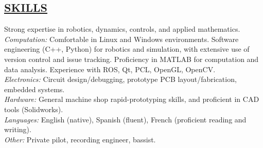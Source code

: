 \documentclass[line,margin]{res}
\newcommand{\CVOnly}[1]{}
\newcommand{\CVOnly}[1]{#1}
\begin{document}
\begin{resume}
\section{\underline{SKILLS}}
\vspace{1.0pc}Strong expertise in robotics, dynamics, controls, and applied mathematics.
\\[0.25pc] {\sl Computation: }
Comfortable in Linux and Windows environments.
Software engineering (C++, Python) for robotics and simulation, with extensive use of version control and issue tracking. 
Proficiency in MATLAB for computation and data analysis.
Experience with ROS, Qt, PCL, OpenGL, OpenCV. 
\\[0.25pc]{\sl Electronics: } Circuit design/debugging, prototype PCB layout/fabrication, embedded systems.  
\\[0.25pc]{\sl Hardware: } General machine shop rapid-prototyping skills, and proficient in CAD tools (Solidworks). 
\\[0.25pc]{\sl Languages: } English (native), Spanish (fluent), French (proficient reading and writing). 
\\[0.25 		pc]{\sl Other: } Private pilot, recording engineer, bassist.    
%
%
\CVOnly{
\section{\underline{AWARDS}}
\vspace{1.0pc}	
          2007-2012 National Science Foundation Graduate Research Fellowship 
\CVOnly{\\[0.0pc]2007 Stanford Graduate Fellowship }
\CVOnly{\\[0.0pc]2007 John McCamey Award presented by ISA}
\ResumeOnly{\\[0.0pc] Member of Tau Beta Pi and Phi Kappa Phi Honor Societies}
\CVOnly{
\\[0.0pc] Member, Tau Beta Pi Engineering Honor Society
\\[0.0pc] Member, Sigma Pi Sigma Physics Honor Society
\\[0.0pc] Member, Phi Kappa Phi Honor Society
\\[0.0pc] Member, Mortar Board National College Senior Honor Society
}
}
%
\CVOnly{
\clearpage
\section{\underline{REFERENCES}}
\vspace{1.0pc}
Dr. Kenneth Salisbury, Prof. Computer Science, 650.465.5700, jks@robotics.stanford.edu
\\[0.0pc]Dr. Paul Mitiguy, Prof. Mechanical Engineering, 650.346.9595,  mitiguy@stanford.edu
\\[0.0pc]Dr. Kaijen Hsiao, Bosch Research and Technology Center, 617.304.1759, kaijenhsiao@gmail.com
}
% 
\end{resume}
\end{document}
